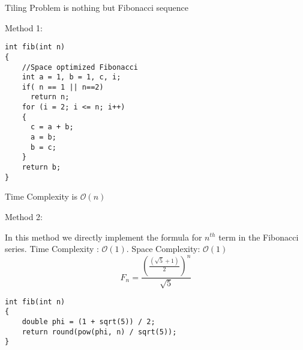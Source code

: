 \documentclass[twoside,12pt,a4paper,english]{book}
\theoremstyle{definition}
\theoremstyle{problemstyle}
\theoremstyle{problemstyle}
\theoremstyle{problemstyle}
\begin{document}
\newpage
\begin{tcolorbox}[title=Solution]

Tiling Problem is nothing but Fibonacci sequence

Method 1:


\begin{lstlisting}
int fib(int n)
{
    //Space optimized Fibonacci
    int a = 1, b = 1, c, i;
    if( n == 1 || n==2)
      return n;
    for (i = 2; i <= n; i++)
    {
      c = a + b;
      a = b;
      b = c;
    }
    return b;
}
\end{lstlisting}

Time Complexity is $\mathcal{O}(n)$

Method 2:

In this method we directly implement the formula for $n^{th}$ term in the Fibonacci series. Time Complexity : $\mathcal{O}(1)$. Space Complexity: $\mathcal{O}(1)$
$$F_n = \frac{(\frac{(\sqrt{5} + 1)}{2})^ n}{\sqrt{5}}$$
\begin{lstlisting}
int fib(int n)
{
    double phi = (1 + sqrt(5)) / 2;
    return round(pow(phi, n) / sqrt(5));
}
\end{lstlisting}
\end{tcolorbox}
\newpage
\end{document}
